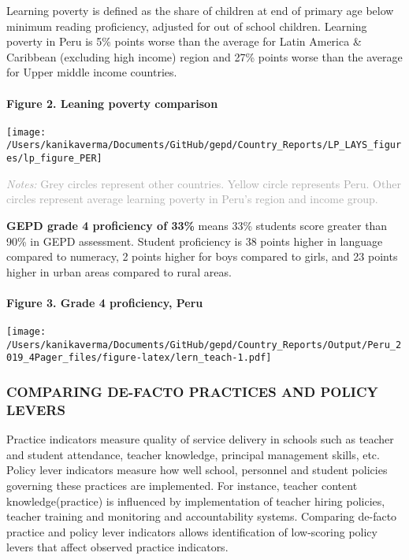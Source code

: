 \documentclass[
  twocolumn]{article}
\begin{document}
Learning poverty is defined as the share of children at end of primary
age below minimum reading proficiency, adjusted for out of school
children. Learning poverty in Peru is 5\% points worse than the average
for Latin America \& Caribbean (excluding high income) region and 27\%
points worse than the average for Upper middle income countries.

\hypertarget{figure-2.-leaning-poverty-comparison}{%
\paragraph{Figure 2. Leaning poverty
comparison}\label{figure-2.-leaning-poverty-comparison}}

\texttt{[image: /Users/kanikaverma/Documents/GitHub/gepd/Country\_Reports/LP\_LAYS\_figures/lp\_figure\_PER]}

{\scriptsize
    \textcolor{darkgray}{\textit{Notes:} Grey circles represent other countries. Yellow circle represents Peru. Other circles represent average learning poverty in Peru's region and income group.}
  }

\textbf{GEPD grade 4 proficiency of 33\%} means 33\% students score
greater than 90\% in GEPD assessment. Student proficiency is 38 points
higher in language compared to numeracy, 2 points higher for boys
compared to girls, and 23 points higher in urban areas compared to rural
areas. \vfill\null

\hypertarget{figure-3.-grade-4-proficiency-peru}{%
\paragraph{Figure 3. Grade 4 proficiency,
Peru}\label{figure-3.-grade-4-proficiency-peru}}

\texttt{[image: /Users/kanikaverma/Documents/GitHub/gepd/Country\_Reports/Output/Peru\_2019\_4Pager\_files/figure-latex/lern\_teach-1.pdf]}

\hypertarget{comparing-de-facto-practices-and-policy-levers}{%
\subsubsection{\texorpdfstring{\textbf{COMPARING DE-FACTO PRACTICES AND
POLICY
LEVERS}}{COMPARING DE-FACTO PRACTICES AND POLICY LEVERS}}\label{comparing-de-facto-practices-and-policy-levers}}

Practice indicators measure quality of service delivery in schools such
as teacher and student attendance, teacher knowledge, principal
management skills, etc. Policy lever indicators measure how well school,
personnel and student policies governing these practices are
implemented. For instance, teacher content knowledge(practice) is
influenced by implementation of teacher hiring policies, teacher
training and monitoring and accountability systems. Comparing de-facto
practice and policy lever indicators allows identification of
low-scoring policy levers that affect observed practice indicators.
\end{document}
